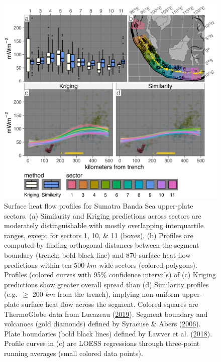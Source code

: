 \begin{figure}[htbp]

{\centering \includegraphics[width=1\linewidth,]{assets/figs/chpt3/SumatraBandaSeaUpperPlate} 

}

\caption[Surface heat flow profiles for Sumatra Banda Sea upper-plate sectors]{Surface heat flow profiles for Sumatra Banda Sea upper-plate sectors. (a) Similarity and Kriging predictions across sectors are moderately distinguishable with mostly overlapping interquartile ranges, except for sectors 1, 10, \& 11 (boxes). (b) Profiles are computed by finding orthogonal distances between the segment boundary (trench; bold black line) and 870 surface heat flow predictions within ten 500 \(km\)-wide sectors (colored polygons). Profiles (colored curves with 95\% confidence intervals) of (c) Kriging predictions show greater overall spread than (d) Similarity profiles (e.g.~\(\geq\) 200 \(km\) from the trench), implying non-uniform upper-plate surface heat flow across the segment. Colored squares are ThermoGlobe data from Lucazeau (\protect\hyperlink{ref-lucazeau2019}{2019}). Segment boundary and volcanoes (gold diamonds) defined by Syracuse \& Abers (\protect\hyperlink{ref-syracuse2006}{2006}). Plate boundaries (bold black lines) defined by Lawver et al. (\protect\hyperlink{ref-lawver2018}{2018}). Profile curves in (c) are LOESS regressions through three-point running averages (small colored data points).}\label{fig:sumatraBandaSeaUpper}
\end{figure}

